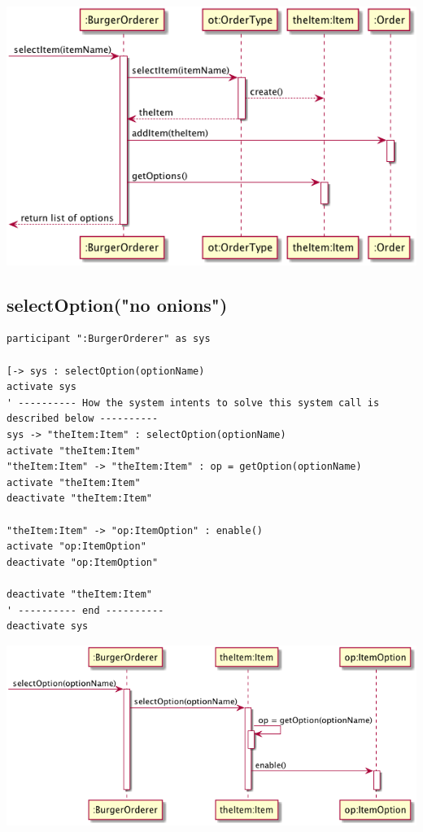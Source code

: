 \documentclass[11pt]{article}
\begin{document}
\begin{center}
\includegraphics[width=.9\linewidth]{202004-bo-selectItem.png}
\end{center}
\subsection{selectOption("no onions")}
\label{sec:orgd8041bf}
\begin{verbatim}
participant ":BurgerOrderer" as sys

[-> sys : selectOption(optionName)
activate sys
' ---------- How the system intents to solve this system call is described below ----------
sys -> "theItem:Item" : selectOption(optionName)
activate "theItem:Item"
"theItem:Item" -> "theItem:Item" : op = getOption(optionName)
activate "theItem:Item"
deactivate "theItem:Item"

"theItem:Item" -> "op:ItemOption" : enable()
activate "op:ItemOption"
deactivate "op:ItemOption"

deactivate "theItem:Item"
' ---------- end ----------
deactivate sys
\end{verbatim}

\begin{center}
\includegraphics[width=.9\linewidth]{202004-bo-selectOption.png}
\end{center}
\end{document}
